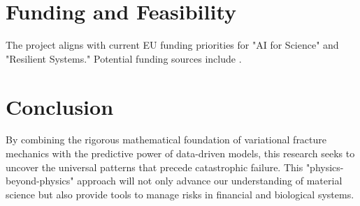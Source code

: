 \documentclass[12pt]{article}
\begin{document}
\section{Funding and Feasibility}
The project aligns with current EU funding priorities for "AI for Science" and "Resilient Systems." Potential funding sources include .

\section{Conclusion}
By combining the rigorous mathematical foundation of variational fracture mechanics with the predictive power of data-driven models, this research seeks to uncover the universal patterns that precede catastrophic failure. This "physics-beyond-physics" approach will not only advance our understanding of material science but also provide tools to manage risks in financial and biological systems.
\end{document}

